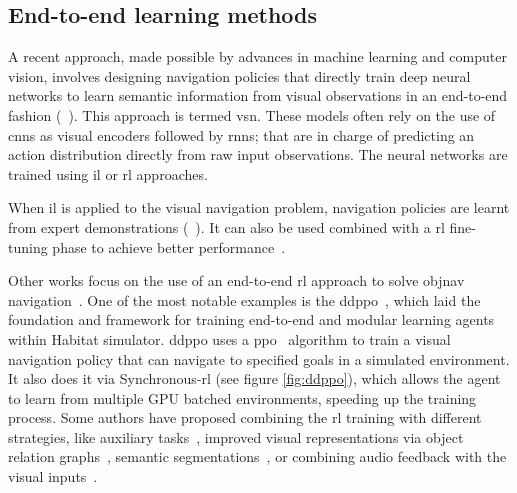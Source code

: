 \subsection{End-to-end learning methods}\label{subsec:end-to-end-learning-methods}

A recent approach, made possible by advances in machine learning and computer vision, involves designing navigation policies that directly train deep neural networks to learn semantic information from visual observations in an end-to-end fashion (\eg~\cite{ramrakhya2022, yadav2022, gutierrez2019, khandelwal2022, chaplot2020,chang2020}).
This approach is termed \acrlong{vsn}.
These models often rely on the use of \acrshort{cnn}s as visual encoders followed by \acrshort{rnn}s; that are in charge of predicting an action distribution directly from raw input observations.
The neural networks are trained using \acrfull{il} or \acrshort{rl} approaches.

When \acrshort{il} is applied to the visual navigation problem, navigation policies are learnt from expert demonstrations (\eg~\cite{ramrakhya2022,yadav2022}).
It can also be used combined with a \acrshort{rl} fine-tuning phase to achieve better performance~\cite{ramrakhya2023}.

Other works focus on the use of an end-to-end \acrshort{rl} approach to solve \acrfull{objnav} navigation~\cite{zhu2017, gutierrez2019, khandelwal2022, Liu2022, Yadav2023OVRLV2AS, Xu2024DeepRL, YokoyamaHM3DOVONAD}.
One of the most notable examples is the \acrfull{ddppo}~\cite{wijmans2020}, which laid the foundation and framework for training end-to-end and modular learning agents within Habitat simulator.
\acrshort{ddppo} uses a \acrfull{ppo}~\cite{schulman2017} algorithm to train a visual navigation policy that can navigate to specified goals in a simulated environment.
It also does it via Synchronous-\acrshort{rl} (see figure \ref{fig:ddppo}), which allows the agent to learn from multiple GPU batched environments, speeding up the training process.
Some authors have proposed combining the \acrshort{rl} training with different strategies, like auxiliary tasks~\cite{ye2021}, improved visual representations via object relation graphs~\cite{yang2018}, semantic segmentations~,\cite{Mousavian2018} or combining audio feedback with the visual inputs~\cite{Wang2023, Kondoh2023MultigoalAN}.

